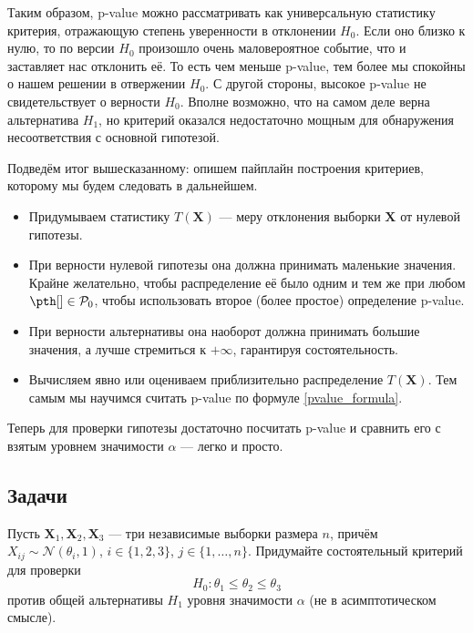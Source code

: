 Таким образом, p-value можно рассматривать как универсальную статистику критерия, отражающую степень уверенности в отклонении $H_0$. Если оно близко к нулю, то по версии $H_0$ произошло очень маловероятное событие, что и заставляет нас отклонить её. То есть чем меньше p-value, тем более мы спокойны о нашем решении в отвержении $H_0$. С другой стороны, высокое p-value не свидетельствует о верности $H_0$. Вполне возможно, что на самом деле верна альтернатива $H_1$, но критерий оказался недостаточно мощным для обнаружения несоответствия с основной гипотезой. 

Подведём итог вышесказанному: опишем пайплайн построения критериев, которому мы будем следовать в дальнейшем.

\begin{testconstruction*}{}{}
	\begin{itemize}
	\item Придумываем статистику $T(\mathbf X)$ --- меру отклонения выборки $\mathbf X$ от нулевой гипотезы.
	\item При верности нулевой гипотезы она должна принимать маленькие значения. Крайне желательно, чтобы распределение её было одним и тем же при любом $\pth[] \in \mathcal{P}_0$, чтобы использовать второе (более простое) определение p-value.
	\item При верности альтернативы она наоборот должна принимать большие значения, а лучше стремиться к $+\infty$, гарантируя состоятельность.
	\item Вычисляем явно или оцениваем приблизительно распределение $T(\mathbf X)$. Тем самым мы научимся считать p-value по формуле \eqref{pvalue_formula}.
\end{itemize}
\end{testconstruction*}

Теперь для проверки гипотезы достаточно посчитать p-value и сравнить его с взятым уровнем значимости $\alpha$ --- легко и просто.

\subsection*{Задачи}

\begin{problem}
	Пусть $\mathbf{X}_1, \mathbf{X}_2, \mathbf{X}_3$ --- три независимые выборки размера $n$, причём $X_{ij} \sim \mathcal{N}(\theta_i, 1)$, $i \in \{1, 2, 3\}$, $j \in \{1, \ldots, n\}$. Придумайте состоятельный критерий для проверки
\[
H_0\colon \theta_1 \le \theta_2 \le \theta_3
\]
против общей альтернативы $H_1$ уровня значимости $\alpha$ (не в асимптотическом смысле).
\end{problem}

